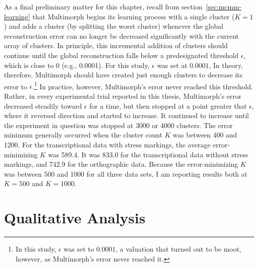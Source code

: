 As a final preliminary matter for this chapter, recall from 
section~\ref{sec:mcmm-learning}
that Multimorph begins its learning process with a single cluster ($K = 1$) 
and adds a cluster (by splitting the worst cluster) whenever the 
global reconstruction error can no longer be decreased 
significantly with the current
array of clusters. In principle, this incremental addition 
of clusters
should continue until the global reconstruction falls below a predesignated 
threshold $\epsilon$, which is close to $0$ (e.g., 0.0001).  For this study, $\epsilon$ was
 set at $0.0001$, 
In theory, therefore, Multimorph should have created just enough clusters to decrease its error to $\epsilon$.\footnote{In this study, $\epsilon$ was set to $0.0001$, a valuation that turned out to be moot, however, as Multimorph's error never reached it.}
In practice, however,
 Multimorph's error never reached this threshold.
 Rather, in every experimental trial reported in this thesis, Multimorph's 
 error decreased steadily toward $\epsilon$ for a time, but then stopped at a point greater that  $\epsilon$, 
 where it reversed direction and started to increase.  
It continued to increase until the experiment in question was stopped at 3000 or 4000 clusters.  
The error minimum generally occurred when the cluster count $K$ was between 400 and 1200. 
For the transcriptional data with stress markings, the average error-minimizing $K$ was 589.4.
It was
833.0 for the transcriptional data without stress markings,
and 742.9 for the orthographic data. Because the error-minimizing $K$ was between 500 and 1000
for all three data sets, I am reporting results both at $K = 500$ and $K = 1000$.

\section{Qualitative Analysis}
\label{sec:qual}

